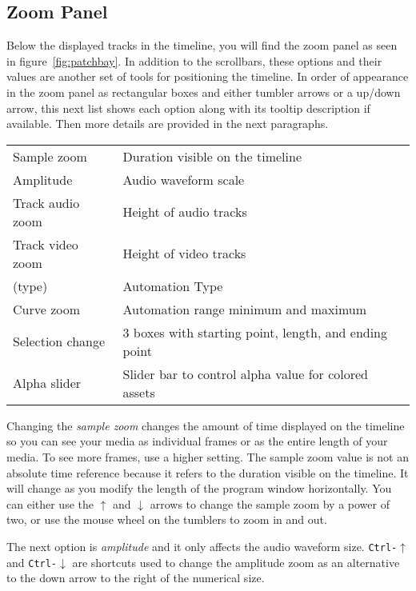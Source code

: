 \subsection{Zoom Panel}%
\label{sub:zoom_panel}

Below the displayed tracks in the timeline, you will find the zoom panel as seen in figure~\ref{fig:patchbay}.
In addition to the scrollbars, these options and their values are another set of tools for positioning the timeline.  
In order of appearance in the zoom panel as rectangular boxes and either tumbler arrows or a up/down arrow, this next list shows each option along with its tooltip description if available.
Then more details are provided in the next paragraphs.

\vspace{2ex}
\begin{tabular}{ll}
   \hline
	Sample zoom & Duration visible on the timeline \\
	Amplitude & Audio waveform scale \\
	Track audio zoom & Height of audio tracks \\
	Track video zoom & Height of video tracks \\
	  (type) & Automation Type \\
	Curve zoom & Automation range minimum and maximum \\
	Selection change & 3 boxes with starting point, length, and ending point \\
	Alpha slider & Slider bar to control alpha value for colored assets \\
   \hline
\end{tabular}

Changing the \emph{sample zoom} changes the amount of time displayed on the timeline 
so you can see your media as individual frames or as the entire length of your media. 
To see more frames, use a higher setting. 
The sample zoom value is not an absolute time reference because it refers to the duration visible on the timeline. It will change as you modify the length of the program window horizontally.
You can either use the $\uparrow$ and $\downarrow$ arrows to change the sample zoom by a power of two, or use the mouse wheel on the tumblers to zoom in and out.


The next option is \emph{amplitude} and it only affects the audio waveform size. \texttt{Ctrl-$\uparrow$} and \texttt{Ctrl-$\downarrow$} are shortcuts used to change the amplitude zoom as an alternative to the down arrow to the right of the numerical size.

